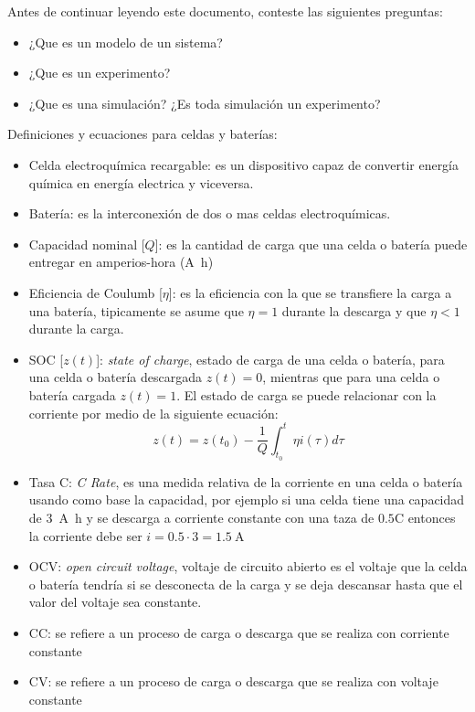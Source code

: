 \documentclass[12pt]{article}
\begin{document}

Antes de continuar leyendo este documento, conteste las siguientes preguntas:
\begin{itemize}
    \item ¿Que es un modelo de un sistema? 
    \item ¿Que es un experimento?   
    \item ¿Que es una simulación? ¿Es toda simulación un experimento?
\end{itemize}

Definiciones y ecuaciones para celdas y baterías:
\begin{itemize}
    \item Celda electroquímica recargable: es un dispositivo capaz de convertir energía química en energía electrica y viceversa. 
    \item Batería: es la interconexión de dos o mas celdas electroquímicas.
    \item Capacidad nominal [$Q$]: es la cantidad de carga que una celda o batería puede entregar en amperios-hora (\si{\ampere\hour})
    \item Eficiencia de Coulumb [$\eta$]: es la eficiencia con la que se transfiere la carga a una batería, tipicamente se asume que $\eta = 1$ durante la descarga y que $\eta < 1$ durante la carga. 
    \item SOC [$z(t)$]: \emph{state of charge}, estado de carga de una celda o batería, para una celda o batería descargada $z(t) = 0$, mientras que para una celda o batería cargada $z(t) = 1$. El estado de carga se puede relacionar con la corriente por medio de la siguiente ecuación:
    \begin{equation*}
        z(t) = z(t_0) - \dfrac{1}{Q}\int_{t_0}^t \eta i(\tau) d\tau
    \end{equation*}
    \item Tasa C: \emph{C Rate}, es una medida relativa de la corriente en una celda o batería usando como base la capacidad, por ejemplo si una celda tiene una capacidad de \SI{3}{\ampere\hour} y se descarga a corriente constante con una taza de $0.5$C entonces la corriente debe ser $i=0.5\cdot 3 = \SI{1.5}{\ampere}$
    \item OCV: \emph{open circuit voltage}, voltaje de circuito abierto es el voltaje que la celda o batería tendría si se desconecta de la carga y se deja descansar hasta que el valor del voltaje sea constante. 
    \item CC: se refiere a un proceso de carga o descarga que se realiza con corriente constante
    \item CV: se refiere a un proceso de carga o descarga que se realiza con voltaje constante
\end{itemize}
\end{document}

